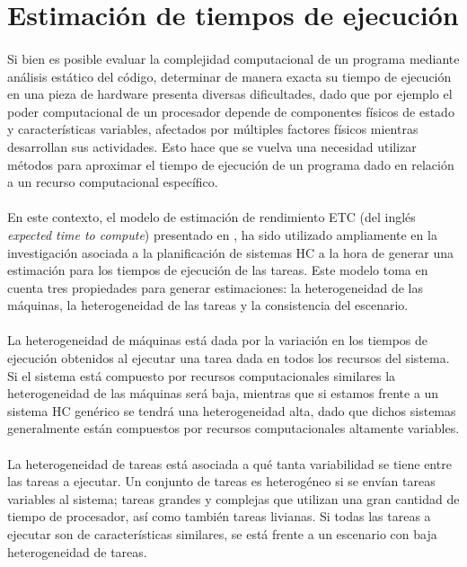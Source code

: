 \section{Estimación de tiempos de ejecución} \label{section:descripcion-problema,subsection:estimacion-tiempo-ejecucion}

\paragraph{}Si bien es posible evaluar la complejidad computacional de un programa mediante análisis estático del código, determinar de manera exacta su tiempo de ejecución en una pieza de hardware presenta diversas dificultades, dado que por ejemplo el poder computacional de un procesador depende de componentes físicos de estado y características variables, afectados por múltiples factores físicos mientras desarrollan sus actividades.
Esto hace que se vuelva una necesidad utilizar métodos para aproximar el tiempo de ejecución de un programa dado en relación a un recurso computacional específico.

\paragraph{}En este contexto, el modelo de estimación de rendimiento ETC (del inglés \textit{expected time to compute}) presentado en \citet{bib-ali-hc-etc}, ha sido utilizado ampliamente en la investigación asociada a la planificación de sistemas HC a la hora de generar una estimación para los tiempos de ejecución de las tareas.
Este modelo toma en cuenta tres propiedades para generar estimaciones: la heterogeneidad de las máquinas, la heterogeneidad de las tareas y la consistencia del escenario.

\paragraph{}La heterogeneidad de máquinas está dada por la variación en los tiempos de ejecución obtenidos al ejecutar una tarea dada en todos los recursos del sistema.
Si el sistema está compuesto por recursos computacionales similares la heterogeneidad de las máquinas será baja, mientras que si estamos frente a un sistema HC genérico se tendrá una heterogeneidad alta, dado que dichos sistemas generalmente están compuestos por recursos computacionales altamente variables.

\paragraph{}La heterogeneidad de tareas está asociada a qué tanta variabilidad se tiene entre las tareas a ejecutar.
Un conjunto de tareas es heterogéneo si se envían tareas variables al sistema; tareas grandes y complejas que utilizan una gran cantidad de tiempo de procesador, así como también tareas livianas.
Si todas las tareas a ejecutar son de características similares, se está frente a un escenario con baja heterogeneidad de tareas.

